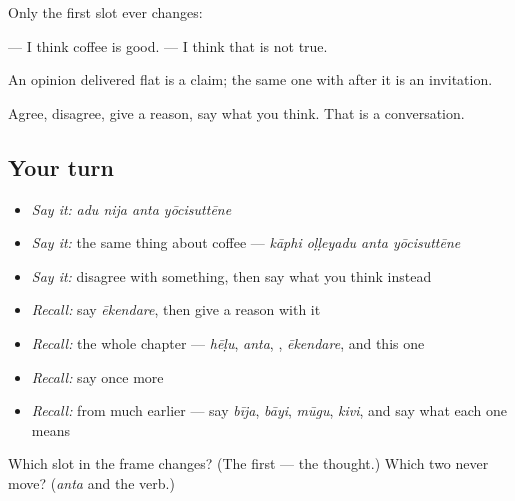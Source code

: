 \begin{grammarlens}[title={Grammar Lens: one frame, and the slot you change}]
Only the first slot ever changes:

\textbf{   } — I think coffee is good. \textbf{    } — I think that is not true.

An opinion delivered flat is a claim; the same one with  after it is an invitation.
\end{grammarlens}

\begin{grammarlens}[title={What you've built}]
Agree, disagree, give a reason, say what you think. That is a conversation.
\end{grammarlens}

\subsection*{Your turn}
\begin{itemize}
\raggedright
  \item \emph{Say it:} \emph{adu nija anta yōcisuttēne}
  \item \emph{Say it:} the same thing about coffee — \emph{kāphi oḷḷeyadu anta yōcisuttēne}
  \item \emph{Say it:} disagree with something, then say what you think instead
  \item \emph{Recall:} say \emph{ēkendare}, then give a reason with it
  \item \emph{Recall:} the whole chapter — \emph{hēḷu}, \emph{anta}, \emph{}, \emph{ēkendare}, and this one
  \item \emph{Recall:} say \emph{} once more
  \item \emph{Recall:} from much earlier — say \emph{bīja}, \emph{bāyi}, \emph{mūgu}, \emph{kivi}, and say what each one means
\end{itemize}

\begin{tcolorbox}[breakable,colback=teal!4,colframe=teal!35!black,title={Before you move on}]
Which slot in the frame changes? (The first — the thought.) Which two never move? (\emph{anta} and the verb.)
\end{tcolorbox}

